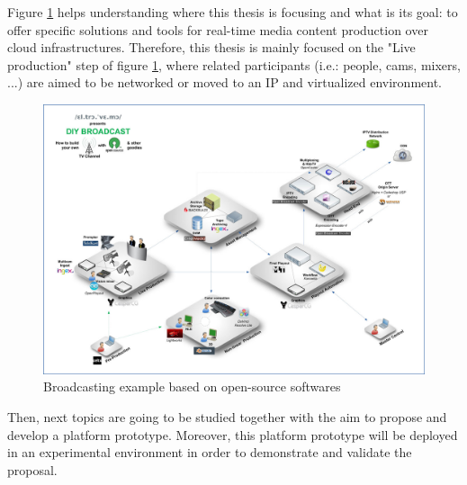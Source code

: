 Figure \ref{F:bebooss} helps understanding where this thesis is focusing and what is its goal:  to offer specific solutions and tools for real-time media content production over cloud infrastructures. Therefore, this thesis is mainly focused on the "Live production" step of figure \ref{F:bebooss}, where related participants (i.e.: people, cams, mixers, ...) are aimed to be networked or moved to an IP and virtualized environment.

\begin{figure}[!htb]
\begin{center}
\includegraphics[width=1\textwidth]{./images/DIY_broadcast_platform_exportweb.jpg}
\caption{Broadcasting example based on open-source softwares \cite{bexample}}
\label{F:bebooss}
\end{center}
\end{figure}

Then, next topics are going to be studied together with the aim to propose and develop a platform prototype. Moreover, this platform prototype will be deployed in an experimental environment in order to demonstrate and validate the proposal. 

